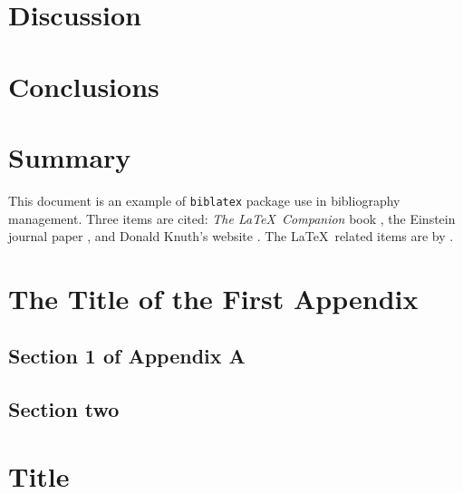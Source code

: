 \documentclass[doublespace,nopageskip]{UVAthesis}
\begin{document}
	\chapter{Discussion} \label{ch:discussion}
	\lipsum[6-12]
	\chapter{Conclusions} \label{ch:conclusions}
	\lipsum[5-11]
	\chapter{Summary} \label{ch:summary}
	\lipsum[1-3]
	
	This document is an example of \texttt{biblatex} package use in bibliography 
management. Three items are cited: \textit{The \LaTeX\ Companion} book \autocite{latexcompanion}, the Einstein journal paper \parencite{einstein}, and 
Donald Knuth's website \parencite{knuthwebsite}. The \LaTeX\ related items are by
\textcite{latexcompanion,knuthwebsite}. 


	\printbibliography[heading=bibintoc]
	   

	\appendix

	\begin{appendices}
		\chapter{The Title of the First Appendix}
		\label{app:appendixA}
		\lipsum[3]
			\section{Section 1 of Appendix A} \label{app:appendixA_1}
			\lipsum[4]
				
			\section{Section two} \label{app:appendixA_2}
			\lipsum[5]
				
		\chapter{Title} 
		\label{app:appendixB}
			\lipsum[6-7]
	\end{appendices}
\end{document}
